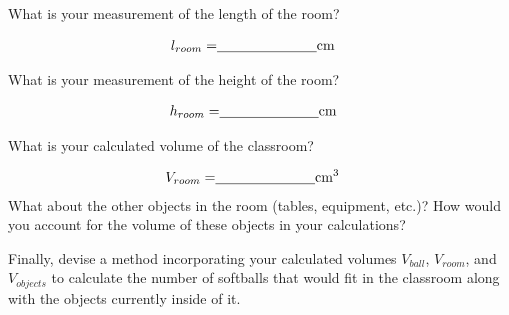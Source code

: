 \begin{questions}
What is your measurement of the length of the room? 
\qsp

\begin{align*}
l_{room} =& \underline{\hspace{2.5cm}}\SI{}{cm}
\end{align*} 

What is your measurement of the height of the room? 
\qsp

\begin{align*}
h_{room} =& \underline{\hspace{2.5cm}}\SI{}{cm}
\end{align*} 

What is your calculated volume of the classroom? 
\qsp 

\begin{align*}
V_{room} =& \underline{\hspace{2.5cm}}\SI{}{cm^3}
\end{align*} 
\question[3] What about the other objects in the room (tables, equipment, etc.)? How would you account for the volume of these objects in your calculations? 
\question[2] Finally, devise a method incorporating your calculated volumes $V_{ball}$, $V_{room}$, and $V_{objects}$ to calculate the number of softballs that would fit in the classroom along with the objects currently inside of it. 

\end{questions}

